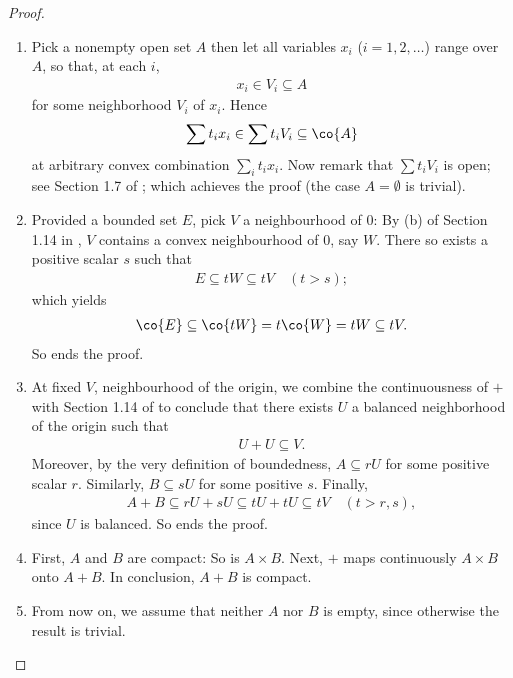 \begin{proof}
\renewcommand{\labelenumi}{(\alph{enumi})} 
\begin{enumerate}
\item 
Pick a nonempty open set $A$ then let all variables %
$\mathit{x_i}$ ($i=1, 2, \dots$) range over $A$, %
so that, at each $i$,  %
%
\begin{align}
  x_i \in V_i \subseteq A 
\end{align}
%
for some neighborhood $V_i$ of $x_i$. %
%
Hence 
%
\begin{align}
  \sum t_i x_i \in \sum t_i V_i  \subseteq \co{A}
\end{align}
%
at arbitrary convex combination $\sum_i t_i x_i$. %
Now remark that $\sum t_i V_i$ is open; see Section 1.7 of \cite{FA}; %
which achieves the proof (the case $A=\emptyset$ is trivial). %
%
\item Provided a bounded set $E$, %
pick $V$ a neighbourhood of $0$: By (b) of Section 1.14 in \cite{FA}, %
$V$ contains a convex neighbourhood of $0$, say $W$. %
%
There so exists a positive scalar $s$ such that
%
\begin{align}
  E \subseteq tW \subseteq tV \quad (t>s); 
\end{align}
%
which yields %
%
\begin{align}
  \co{E} \subseteq \co{tW} = t\co{W} = t W \subseteq tV.
\end{align}
%
So ends the proof. %
%
\item At fixed $V$, neighbourhood of the origin, %
we combine the continuousness of $+$ with Section 1.14 of \cite{FA} %
to conclude that there exists $U$ a balanced neighborhood of the origin %
such that %
%
\begin{align}
  U+U\subseteq V. 
\end{align}
%
Moreover, by the very definition of boundedness, %
$A \subseteq r U$ for some positive scalar $r$. %
Similarly, $B \subseteq s U$ for some positive $s$. %
%
Finally, 
%
\begin{align}
A+B \subseteq  rU + sU \subseteq tU + tU \subseteq tV \quad (t > r, s), 
\end{align}
%
since $U$ is balanced. So ends the proof. %
%
\item First, $A$ and $B$ are compact: So is $A\times B$. %
Next, $+$ maps continuously $A\times B$ onto $A+B$. %
In conclusion, $A+B$ is compact. %
%
\item From now on, we assume that neither $A$ nor $B$ is empty, %
since otherwise the result is trivial.  %

\end{enumerate}
\end{proof}

